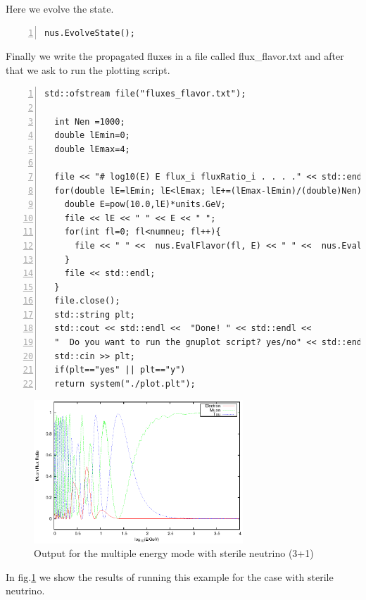 \documentclass[3p,12pt]{elsarticle}
\newcommand{\ttf}{\ttfamily}
\begin{document}
Here we evolve the state.

\begin{lstlisting}[frame=leftline, numbers = left,breaklines=true,label = ex:sin1,firstnumber=last]
  nus.EvolveState();
\end{lstlisting}

Finally we write the propagated fluxes in a file called {\ttf
  flux\_flavor.txt} and after that we ask to run the plotting script.

\begin{lstlisting}[frame=leftline, numbers = left,breaklines=true,label = ex:sin1,firstnumber=last]
  std::ofstream file("fluxes_flavor.txt");
  
  int Nen =1000;
  double lEmin=0;
  double lEmax=4;
  
  file << "# log10(E) E flux_i fluxRatio_i . . . ." << std::endl;
  for(double lE=lEmin; lE<lEmax; lE+=(lEmax-lEmin)/(double)Nen){
    double E=pow(10.0,lE)*units.GeV;
    file << lE << " " << E << " ";
    for(int fl=0; fl<numneu; fl++){
      file << " " <<  nus.EvalFlavor(fl, E) << " " <<  nus.EvalFlavor(fl, E)/(N0*pow(E,-2));
    }
    file << std::endl;
  }
  file.close();
  std::string plt;
  std::cout << std::endl <<  "Done! " << std::endl <<
  "  Do you want to run the gnuplot script? yes/no" << std::endl;
  std::cin >> plt;
  if(plt=="yes" || plt=="y")
  return system("./plot.plt");
\end{lstlisting}


\begin{figure}[h!]
  \label{fig:multimode}
  \centering
  \includegraphics[width=0.7\textwidth]{fig/Multiplot.eps} 
  \caption{Output for the multiple energy mode with sterile neutrino (3+1)} 
\end{figure}
 
In fig.\ref{fig:multimode} we show the results of running this example
for the case with sterile neutrino.
\end{document}
